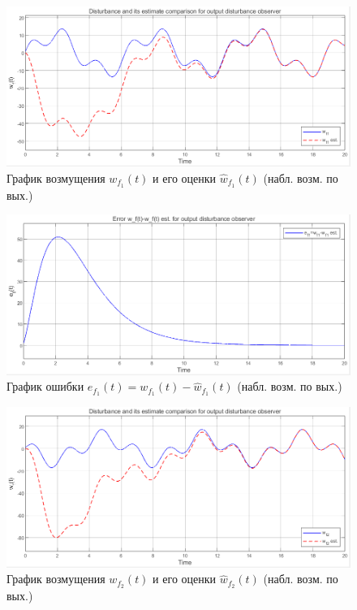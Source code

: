 \documentclass[a4paper, 12pt]{article}
\begin{document}
    \begin{figure}[H]
        \centering
        \includegraphics[scale=0.6]{3task_wfhwf12.png}
        \captionsetup{skip=0pt}
        \caption{График возмущения $w_{f_1}(t)$ и его оценки $\hat{w}_{f_1}(t)$ (набл. возм. по вых.)}
        \label{fig:3task_wfhwf12}
    \end{figure}
    \begin{figure}[H]
        \centering
        \includegraphics[scale=0.6]{3task_ef12.png}
        \captionsetup{skip=0pt}
        \caption{График ошибки $e_{f_1}(t)=w_{f_1}(t)-\hat{w}_{f_1}(t)$ (набл. возм. по вых.)}
        \label{fig:3task_ef12}
    \end{figure}
    \begin{figure}[H]
        \centering
        \includegraphics[scale=0.6]{3task_wfhwf22.png}
        \captionsetup{skip=0pt}
        \caption{График возмущения $w_{f_2}(t)$ и его оценки $\hat{w}_{f_2}(t)$ (набл. возм. по вых.)}
        \label{fig:3task_wfhwf22}
    \end{figure}
\end{document}
